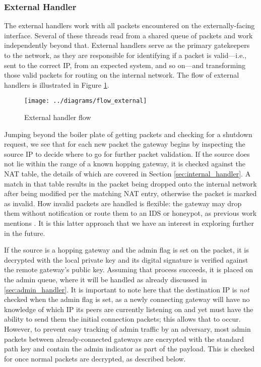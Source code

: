 \subsubsection{External Handler}
\label{sec:external_handler}

\par The external handlers work with all packets encountered on the externally-facing interface. Several of these threads read from a shared queue of packets and work independently beyond that. External handlers serve as the primary gatekeepers to the network, as they are responsible for identifying if a packet is valid---i.e., sent to the correct IP, from an expected system, and so on---and transforming those valid packets for routing on the internal network. The flow of external handlers is illustrated in Figure \ref{fig:flow_external}.

\begin{figure}
	\centering
	\texttt{[image: ../diagrams/flow\_external]}
	\caption{External handler flow}
	\label{fig:flow_external}
\end{figure}

\par Jumping beyond the boiler plate of getting packets and checking for a shutdown request, we see that for each new packet the gateway begins by inspecting the source IP to decide where to go for further packet validation. If the source does not lie within the range of a known hopping gateway, it is checked against the NAT table, the details of which are covered in Section \ref{sec:internal_handler}. A match in that table results in the packet being dropped onto the internal network after being modified per the matching NAT entry, otherwise the packet is marked as invalid. How invalid packets are handled is flexible: the gateway may drop them without notification or route them to an IDS \cite{NAH} or honeypot, as previous work mentions \cite{SandiaDynat, HopProactiveDef}. It is this latter approach that we have an interest in exploring further in the future.

\par If the source is a hopping gateway and the admin flag is set on the packet, it is decrypted with the local private key and its digital signature is verified against the remote gateway's public key. Assuming that process succeeds, it is placed on the admin queue, where it will be handled as already discussed in \ref{sec:admin_handler}. It is important to note here that the destination IP is \textit{not} checked when the admin flag is set, as a newly connecting gateway will have no knowledge of which IP its peers are currently listening on and yet must have the ability to send them the initial connection packets; this allows that to occur. However, to prevent easy tracking of admin traffic by an adversary, most admin packets between already-connected gateways are encrypted with the standard path key and contain the admin indicator as part of the payload. This is checked for once normal packets are decrypted, as described below.

